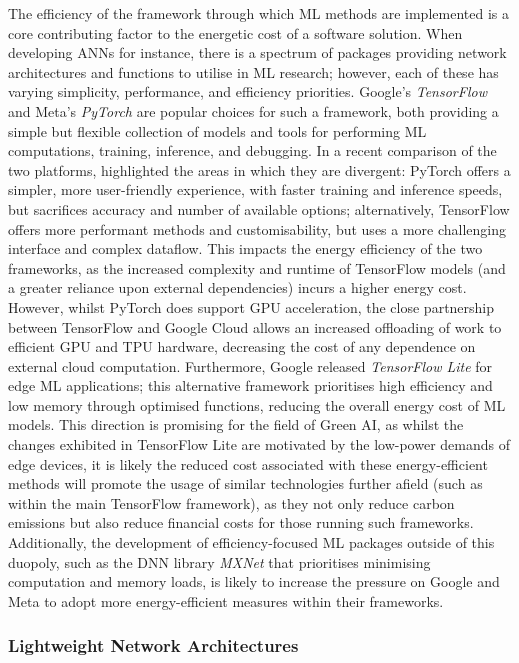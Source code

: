 \documentclass[a4paper, 12pt]{article}
\begin{document}
    The efficiency of the framework through which ML methods are implemented is a core contributing factor to the energetic cost of a software solution. When developing ANNs for instance, there is a spectrum of packages providing network architectures and functions to utilise in ML research; however, each of these has varying simplicity, performance, and efficiency priorities. Google's \emph{TensorFlow} \cite{abadi-2016} and Meta's \emph{PyTorch} \cite{paszke-2019} are popular choices for such a framework, both providing a simple but flexible collection of models and tools for performing ML computations, training, inference, and debugging. In a recent comparison of the two platforms,  highlighted the areas in which they are divergent: PyTorch offers a simpler, more user-friendly experience, with faster training and inference speeds, but sacrifices accuracy and number of available options; alternatively, TensorFlow offers more performant methods and customisability, but uses a more challenging interface and complex dataflow. This impacts the energy efficiency of the two frameworks, as the increased complexity and runtime of TensorFlow models (and a greater reliance upon external dependencies) incurs a higher energy cost. However, whilst PyTorch does support GPU acceleration, the close partnership between TensorFlow and Google Cloud allows an increased offloading of work to efficient GPU and TPU hardware, decreasing the cost of any dependence on external cloud computation. Furthermore, Google released \emph{TensorFlow Lite} \cite{david-2020} for edge ML applications; this alternative framework prioritises high efficiency and low memory through optimised functions, reducing the overall energy cost of ML models. This direction is promising for the field of Green AI, as whilst the changes exhibited in TensorFlow Lite are motivated by the low-power demands of edge devices, it is likely the reduced cost associated with these energy-efficient methods will promote the usage of similar technologies further afield (such as within the main TensorFlow framework), as they not only reduce carbon emissions but also reduce financial costs for those running such frameworks. Additionally, the development of efficiency-focused ML packages outside of this duopoly, such as the DNN library \emph{MXNet} \cite{chen-2015} that prioritises minimising computation and memory loads, is likely to increase the pressure on Google and Meta to adopt more energy-efficient measures within their frameworks.

    \subsubsection{Lightweight Network Architectures}
\end{document}

